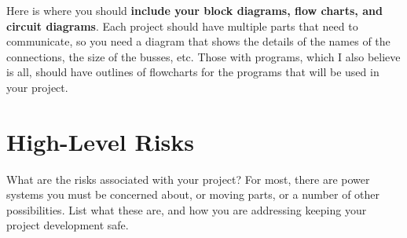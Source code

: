 Here is where you should \textbf{include your block diagrams, flow charts, and circuit diagrams}.
Each project should have multiple parts that need to communicate, so you need a diagram that shows the details
of the names of the connections, the size of the busses, etc.  Those with programs, which I also believe is all,
should have outlines of flowcharts for the programs that will be used in your project.

\section{High-Level Risks}
What are the risks associated with your project?  For most, there are power systems you must be concerned about,
or moving parts, or a number of other possibilities.  List what these are, and how you are addressing keeping
your project development safe.

\pagebreak

